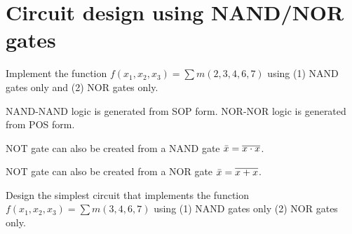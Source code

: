 \maketitle
\section{Circuit design using NAND/NOR gates }

\begin{example}
  Implement the function $f(x_1, x_2, x_3) = \sum m(2, 3, 4, 6, 7)$ using (1)
  NAND gates only and (2) NOR gates only.
\end{example}
\vspace{20em}

\begin{remark}
  NAND-NAND logic is generated from SOP form. NOR-NOR logic is generated from POS form.
\end{remark}

\begin{remark}
  NOT gate can also be created from a NAND gate $\bar{x} = \overline{x \cdot x}$.\\
\end{remark}

\begin{remark}
  NOT gate can also be created from a NOR gate $\bar{x} = \overline{x + x}$.\\
\end{remark}

\begin{prob}
  Design the simplest circuit that implements the function $f (x_1 , x_2 , x_3 ) = \sum m(3, 4, 6, 7)$
  using (1) NAND gates only (2) NOR gates only.
\end{prob}

\vspace{20em}